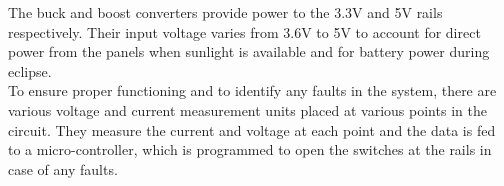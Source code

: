 The buck and boost converters provide power to the 3.3V and 5V rails respectively. Their input voltage varies from 3.6V to 5V to account for direct power from the panels when sunlight is available and for battery power during eclipse.
\\

To ensure proper functioning and to identify any faults in the system, there are various voltage and current measurement units placed at various points in the circuit. They measure the current and voltage at each point and the data is fed to a micro-controller, which is programmed to open the switches at the rails in case of any faults.